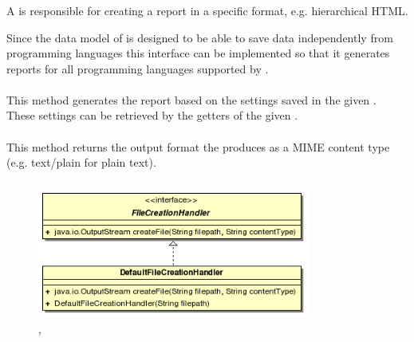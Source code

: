 \subsubsection{} \label{Classes:Report:ReportGenerator}

A  is responsible for creating a report in a specific format, e.g. hierarchical HTML.

Since the data model of \gbt is designed to be able to save data independently from programming languages this interface can be implemented so that it generates reports for all programming languages supported by \gbt.


\paragraph{}
This method generates the report based on the settings saved in the given . These settings can be retrieved by the getters of the given .


\paragraph{}
This method returns the output format the  produces as a MIME content type (e.g. text/plain for plain text).


\subsubsection{} \label{Classes:Report:FileCreationHandler}

\begin{figure}[hbtp]
 \centering
 \includegraphics[width=0.8\textwidth]{images/Report/FileCreationHandler.png}
 \caption{, }
 \label{figure:Classes:Report:FileCreationHandler}
\end{figure}


